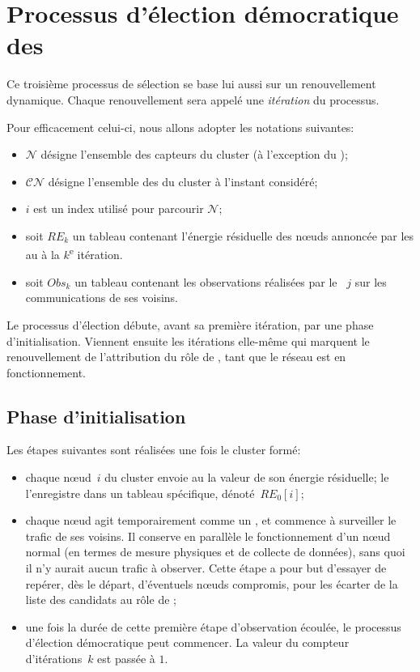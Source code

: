 \section{Processus d'élection démocratique des \cns}\label{sd:sec:proposal}

Ce troisième processus de sélection se base lui aussi sur un renouvellement dynamique.
Chaque renouvellement sera appelé une \emph{itération} du processus.

Pour efficacement celui-ci, nous allons adopter les notations suivantes:
\begin{itemize}
    \item $\mathcal{N}$ désigne l'ensemble des capteurs du cluster (à l'exception du \ch);
    \item $\mathcal{CN}$ désigne l'ensemble des \cns du cluster à l'instant considéré;
    \item $i$ est un index utilisé pour parcourir $\mathcal{N}$;
    \item soit $RE_k$ un tableau contenant l'énergie résiduelle des nœuds annoncée par les \cns au \ch à la $k$\textsuperscript{e} itération.
    \item soit $Obs_k$ un tableau contenant les observations réalisées par le \cn~$j$ sur les communications de ses voisins.
\end{itemize}

Le processus d'élection débute, avant sa première itération, par une phase d'initialisation.
Viennent ensuite les itérations elle-même qui marquent le renouvellement de l'attribution du rôle de \cn, tant que le réseau est en fonctionnement.

    \subsection{Phase d'initialisation}

Les étapes suivantes sont réalisées une fois le cluster formé:
\begin{itemize}
    \item chaque nœud~$i$ du cluster envoie au \ch la valeur de son énergie résiduelle; le \CH l'enregistre dans un tableau spécifique, dénoté~$RE_0[i]$;
    \item chaque nœud agit temporairement comme un \cn, et commence à surveiller le trafic de ses voisins. Il conserve en parallèle le fonctionnement d'un nœud normal (en termes de mesure physiques et de collecte de données), sans quoi il n'y aurait aucun trafic à observer. Cette étape a pour but d'essayer de repérer, dès le départ, d'éventuels nœuds compromis, pour les écarter de la liste des candidats au rôle de \cn;
    \item une fois la durée de cette première étape d'observation écoulée, le processus d'élection démocratique peut commencer. La valeur du compteur d'itérations~$k$ est passée à $1$.
\end{itemize}

